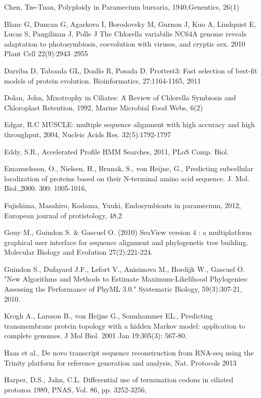 \documentclass[a4paper,11pt]{article}
\begin{document}
 
\noindent Chen, Tze-Tuan, Polyploidy in Paramecium bursaria, 1940,Genentics,  26(1)

 
\noindent Blanc G, Duncan G, Agarkova I, Borodovsky M, Gurnon J, Kuo A, Lindquist E, Lucas S, Pangilinan J, Polle J The Chlorella variabilis NC64A genome reveals adaptation to photosymbiosis, coevolution with viruses, and cryptic sex. 2010 Plant Cell 22(9):2943–2955

 
\noindent Darriba D, Taboada GL, Doallo R, Posada D. Prottest3: Fast selection of best-fit models of protein evolution. Bioinformatics, 27:1164-1165, 2011

 
\noindent Dolan, John, Mixotrophy in Ciliates: A Review of Chlorella Symbiosis and Chloroplast Retention, 1992,  Marine Microbial Food Webs,  6(2)

 
\noindent Edgar, R.C MUSCLE: multiple sequence alignment with high accuracy and high throughput, 2004, Nucleic Acids Res. 32(5):1792-1797 

 
\noindent Eddy, S.R., Accelerated Profile HMM Searches, 2011, PLoS Comp. Biol.

 
\noindent Emanuelsson, O., Nielsen, H., Brunak, S., von Heijne, G., Predicting subcellular localization of proteins based on their N-terminal amino acid sequence. J. Mol. Biol.,2000. 300: 1005-1016,

 
\noindent Fujishima, Masahiro,  Kodama, Yuuki, Endosymbionts in paramecium, 2012, European journal of protistology, 48,2

 
\noindent Gouy M., Guindon S. \& Gascuel O. (2010) SeaView version 4 : a multiplatform graphical user interface for sequence alignment and phylogenetic tree building. Molecular Biology and Evolution 27(2):221-224.

 
\noindent Guindon S., Dufayard J.F., Lefort V., Anisimova M., Hordijk W., Gascuel O. "New Algorithms and Methods to Estimate Maximum-Likelihood Phylogenies: Assessing the Performance of PhyML 3.0." Systematic Biology, 59(3):307-21, 2010.

 
\noindent Krogh A., Larsson B., von Heijne G., Sonnhammer EL., Predicting transmembrane protein topology with a hidden Markov model: application to complete genomes. J Mol Biol. 2001 Jan 19;305(3): 567-80.

 
\noindent Haas et al., De novo transcript sequence reconstruction from RNA-seq using the Trinity platform for reference generation and analysis, Nat. Protocols 2013

 
\noindent Harper, D.S., Jahn, C.L. Differential use of termination codons in ciliated protozoa 1989, PNAS, Vol. 86, pp. 3252-3256,
\end{document}

